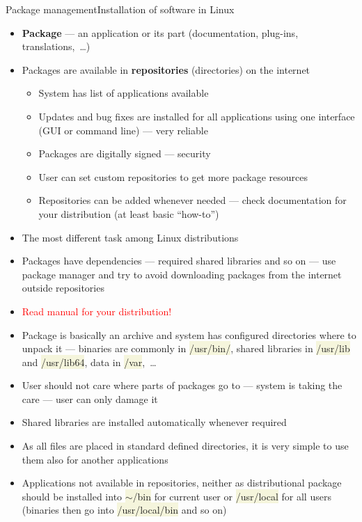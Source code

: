 \documentclass[compress, xelatex, 11pt, xcolor=svgnames, aspectratio=169, url={hyphens, lowtilde}]{beamer}
\renewcommand{\texttt}[1]{\colorbox{Beige}{{\ttfamily #1}}}
\renewcommand{\alert}[1]{\textcolor{red}{#1}}
\begin{document}
\begin{frame}[allowframebreaks]{Package management}{Installation of software in Linux}
	\begin{itemize}
		\item \textbf{Package} --- an application or its part (documentation, plug-ins, translations,~\ldots)
		\item Packages are available in \textbf{repositories} (directories) on the internet
		\begin{itemize}
			\item System has list of applications available
			\item Updates and bug fixes are installed for all applications using one interface (GUI or command line) --- very reliable
			\item Packages are digitally signed --- security
			\item User can set custom repositories to get more package resources
			\item Repositories can be added whenever needed --- check documentation for your distribution (at least basic \enquote{how-to})
		\end{itemize}
		\item The most different task among Linux distributions
		\item Packages have dependencies --- required shared libraries and so on --- use package manager and try to avoid downloading packages from the internet outside repositories
		\item \alert{Read manual for your distribution!}
		\item Package is basically an archive and system has configured directories where to unpack it --- binaries are commonly in \texttt{/usr/bin/}, shared libraries in \texttt{/usr/lib} and \texttt{/usr/lib64}, data in \texttt{/var},~\ldots
		\item User should not care where parts of packages go to --- system is taking the care --- user can only damage it
		\item Shared libraries are installed automatically whenever required
		\item As all files are placed in standard defined directories, it is very simple to use them also for another applications
		\item Applications not available in repositories, neither as distributional package should be installed into \texttt{$\sim$/bin} for current user or \texttt{/usr/local} for all users (binaries then go into \texttt{/usr/local/bin} and so on)

\end{itemize}
\end{frame}
\end{document}

